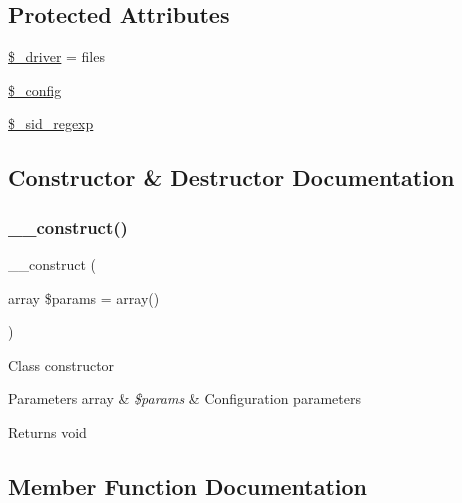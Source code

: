 \subsection*{Protected Attributes}
\begin{DoxyCompactItemize}
\item 
\mbox{\hyperlink{class_c_i___session_a538d24348271772aa61f8239cc6431dd}{\$\+\_\+driver}} = \textquotesingle{}files\textquotesingle{}
\item 
\mbox{\hyperlink{class_c_i___session_a4d4ad4af1600438042f93a4492f8dbbe}{\$\+\_\+config}}
\item 
\mbox{\hyperlink{class_c_i___session_a4e2477585e746eb415b2b69bb237be72}{\$\+\_\+sid\+\_\+regexp}}
\end{DoxyCompactItemize}


\subsection{Constructor \& Destructor Documentation}
\mbox{\label{class_c_i___session_a85ac5b7f54ad67ec6b5b9dc282717602}} 
\subsubsection{\texorpdfstring{\+\_\+\+\_\+construct()}{\_\_construct()}}
{\footnotesize\ttfamily \+\_\+\+\_\+construct (\begin{DoxyParamCaption}\item[{array}]{\$params = {\ttfamily array()} }\end{DoxyParamCaption})}

Class constructor


\begin{DoxyParams}[1]{Parameters}
array & {\em \$params} & Configuration parameters \\
\hline
\end{DoxyParams}
\begin{DoxyReturn}{Returns}
void 
\end{DoxyReturn}


\subsection{Member Function Documentation}
\mbox{\label{class_c_i___session_a4537dad3b44254124991341cc91b28fb}} 
